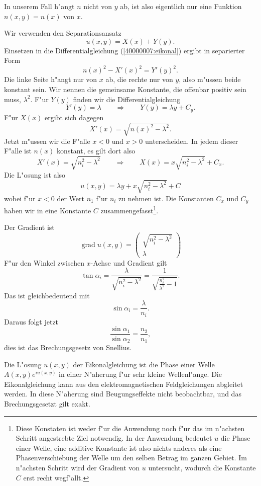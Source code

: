 \begin{loesung}
In unserem Fall h"angt $n$ nicht von $y$ ab, ist also eigentlich
nur eine Funktion $n(x,y)=n(x)$ von $x$.
\begin{teilaufgaben}
\item
Wir verwenden den Separationsansatz
\[
u(x,y)=X(x) + Y(y).
\]
Einsetzen in die Differentialgleichung
(\ref{40000007:eikonal}) ergibt in separierter Form
\[
n(x)^2-X'(x)^2=Y'(y)^2.
\]
Die linke Seite h"angt nur von $x$ ab, die rechte nur von $y$,
also m"ussen beide konstant sein.
Wir nennen die gemeinsame Konstante, die offenbar positiv sein
muss, $\lambda^2$.
F"ur $Y(y)$ finden wir die Differentialgleichung
\[
Y'(y)=\lambda \qquad\Rightarrow\qquad Y(y)=\lambda y+ C_y.
\]
F"ur $X(x)$ ergibt sich dagegen
\[
X'(x)=\sqrt{n(x)^2-\lambda^2}.
\]
Jetzt m"ussen wir die F"alle $x<0$ und $x>0$ unterscheiden.
In jedem dieser F"alle ist $n(x)$ konstant, es gilt dort
also
\[
X'(x)=\sqrt{n_i^2-\lambda^2}
\qquad
\Rightarrow
\qquad
X(x)=x\sqrt{n_i^2-\lambda^2} + C_x.
\]
Die L"osung ist also
\[
u(x,y)=\lambda y + x\sqrt{n_i^2-\lambda^2} + C
\]
wobei f"ur $x<0$ der Wert $n_1$ f"ur $n_i$ zu nehmen ist.
Die Konstanten $C_x$ und $C_y$ haben wir in eine Konstante $C$
zusammengefasst\footnote{Diese Konstaten ist weder f"ur die Anwendung noch
f"ur das im n"achsten Schritt angestrebte Ziel notwendig. In der Anwendung
bedeutet $u$ die Phase einer Welle, eine additive Konstante ist also nichts
anderes als eine Phasenverschiebung der Welle um den selben Betrag
im ganzen Gebiet. Im n"achsten Schritt wird der Gradient von $u$ untersucht,
wodurch die Konstante $C$ erst recht wegf"allt.}.
\item
Der Gradient ist
\[
\operatorname{grad}u(x,y)
=
\begin{pmatrix}
\sqrt{n_i^2-\lambda^2}\\
\lambda
\end{pmatrix}
\]
F"ur den Winkel zwischen $x$-Achse und Gradient gilt
\[
\tan\alpha_i
=
\frac{\lambda}{\sqrt{n_i^2-\lambda^2}}
=
\frac1{\sqrt{\frac{n_i^2}{\lambda^2}-1}}.
\]
Das ist gleichbedeutend mit
\[
\sin\alpha_i=\frac{\lambda}{n_i}.
\]
Daraus folgt jetzt
\[
\frac{ \sin\alpha_1}{\sin\alpha_2}=\frac{n_2}{n_1},
\]
dies ist das Brechungsgesetz von Snellius.
\end{teilaufgaben}
\end{loesung}

\begin{diskussion}
Die L"osung $u(x,y)$ der Eikonalgleichung ist die Phase einer Welle
$A(x,y)e^{iu(x,y)}$ in einer N"aherung f"ur sehr kleine Wellenl"ange.
Die Eikonalgleichung kann aus den elektromagnetischen Feldgleichungen
abgleitet werden.
In diese N"aherung sind Beugungseffekte nicht beobachtbar, und das
Brechungsgesetzt gilt exakt.
\end{diskussion}
